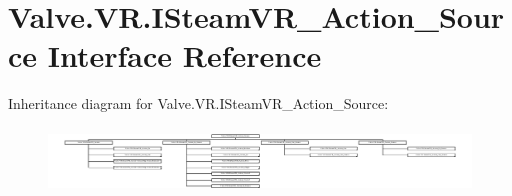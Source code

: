 \hypertarget{interface_valve_1_1_v_r_1_1_i_steam_v_r___action___source}{}\section{Valve.\+V\+R.\+I\+Steam\+V\+R\+\_\+\+Action\+\_\+\+Source Interface Reference}
\label{interface_valve_1_1_v_r_1_1_i_steam_v_r___action___source}
Inheritance diagram for Valve.\+V\+R.\+I\+Steam\+V\+R\+\_\+\+Action\+\_\+\+Source\+:\begin{figure}[H]
\begin{center}
\leavevmode
\includegraphics[height=1.769663cm]{interface_valve_1_1_v_r_1_1_i_steam_v_r___action___source}
\end{center}
\end{figure}
